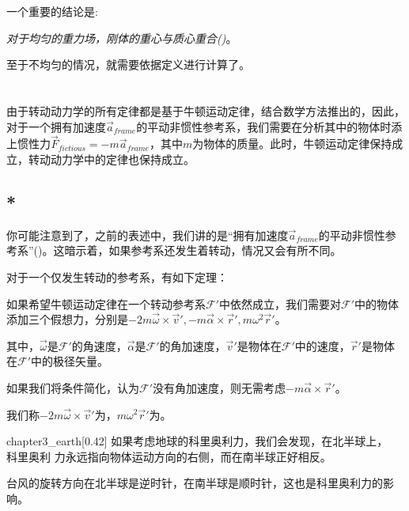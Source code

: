 一个重要的结论是:
\begin{center}
	{\itshape 对于均匀的重力场，刚体的重心与质心重合()}。
\end{center}

至于不均匀的情况，就需要依据定义进行计算了。
\section[非惯性系情形]{}
\subsection[非惯性力]{}
由于转动动力学的所有定律都是基于牛顿运动定律，结合数学方法推出的，因此，对于一个拥有加速度$\vec{a}_{frame}$的平动非惯性参考系，我们需要在分析其中的物体时添上惯性力$\vec{F}_{fictious}=-m\vec{a}_{frame}$，其中$m$为物体的质量。此时，牛顿运动定律保持成立，转动动力学中的定律也保持成立。

\subsection[科里奥利力*]{*}
你可能注意到了，之前的表述中，我们讲的是“拥有加速度$\vec{a}_{frame}$的平动非惯性参考系”()。这暗示着，如果参考系还发生着转动，情况又会有所不同。

对于一个仅发生转动的参考系，有如下定理：
\begin{law}
	如果希望牛顿运动定律在一个转动参考系$\mathcal{F}'$中依然成立，我们需要对$\mathcal{F}'$中的物体添加三个假想力，分别是$-2m\vec{\omega}\times\vec{v}',-m\vec{\alpha}\times\vec{r}',m\omega^2\vec{r}'$。
	
	其中，$\vec{\omega}$是$\mathcal{F}'$的角速度，$\vec{\alpha}$是$\mathcal{F}'$的角加速度，$\vec{v}'$是物体在$\mathcal{F}'$中的速度，$\vec{r}'$是物体在$\mathcal{F}'$中的极径矢量。
	
	如果我们将条件简化，认为$\mathcal{F}'$没有角加速度，则无需考虑$-m\vec{\alpha}\times\vec{r}'$。
	
	我们称$-2m\vec{\omega}\times\vec{v}'$为，$m\omega^2\vec{r}'$为。
\end{law}
\begin{singlefigure}[地球的科里奥利力]{chapter3_earth}[0.42]
如果考虑地球的科里奥利力，我们会发现，在北半球上，\\科里奥利
力永远指向物体运动方向的右侧，而在南半球正好相反。
\end{singlefigure}
台风的旋转方向在北半球是逆时针，在南半球是顺时针，这也是科里奥利力的影响。

